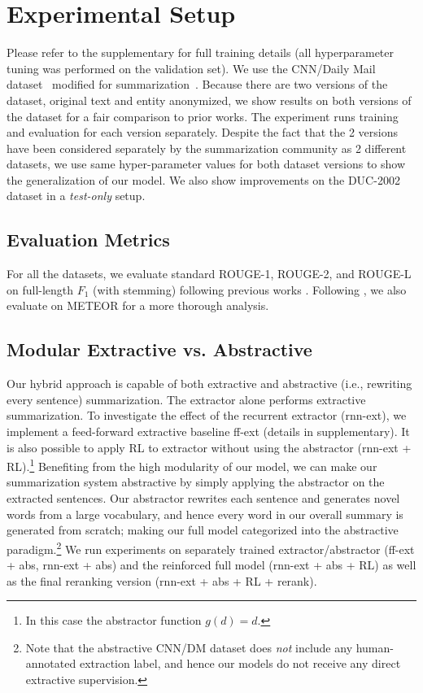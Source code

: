 \documentclass[11pt,a4paper]{article}
\begin{document}
\section{Experimental Setup}

Please refer to the supplementary for full training details (all hyperparameter tuning was performed on the validation set).
We use the CNN/Daily Mail dataset~\cite{nips15_hermann} modified for summarization~\cite{nallapati2016abstractive}.
Because there are two versions of the dataset, original text and entity anonymized,
we show results on both versions of the dataset for a fair comparison to prior works. 
The experiment runs training and evaluation for each version separately.
Despite the fact that the 2 versions have been considered separately by the summarization community as 2 different datasets, we use same hyper-parameter values for both dataset versions to show the generalization of our model.
We also show improvements on the DUC-2002 dataset in a \emph{test-only} setup.




\subsection{Evaluation Metrics}
For all the datasets, we evaluate standard ROUGE-1, ROUGE-2, and ROUGE-L \citep{lin:2004:ACLsummarization} on full-length $F_1$ (with stemming) following previous works 
\citep{AAAI17:summarunner,get_to_the_point,DBLP:journals/corr/PaulusXS17}. 
Following \citet{get_to_the_point}, we also evaluate on METEOR \citep{denkowski:lavie:meteor-wmt:2014} for a more thorough analysis.


\subsection{Modular Extractive vs. Abstractive}
Our hybrid approach is capable of both extractive and abstractive (i.e., rewriting every sentence) summarization.
The extractor alone performs extractive summarization. 
To investigate the effect of the recurrent extractor (rnn-ext), we implement a feed-forward extractive baseline ff-ext (details in supplementary). 
It is also possible to apply RL to extractor without using the abstractor (rnn-ext + RL).\footnote{In this case the abstractor function $g(d) = d$.}
Benefiting from the high modularity of our model, we can make our summarization system abstractive by 
simply applying the abstractor on the extracted sentences.
Our abstractor rewrites each sentence and generates novel words from a large vocabulary, and hence every word in our overall summary is generated from scratch;
making our full model categorized into the abstractive paradigm.\footnote{Note that the abstractive CNN/DM dataset does \emph{not} include any human-annotated extraction label, and hence our models do not receive any direct extractive supervision.}
We run experiments on separately trained extractor/abstractor (ff-ext + abs, rnn-ext + abs) and the reinforced full model (rnn-ext + abs + RL) as well as the final reranking version (rnn-ext + abs + RL + rerank).
\end{document}
